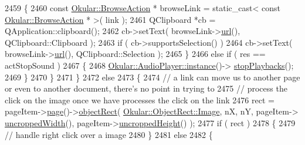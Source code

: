\begin{DoxyCode}
2459                             \{
2460                                 \textcolor{keyword}{const} \hyperlink{classOkular_1_1BrowseAction}{Okular::BrowseAction} * browseLink = \textcolor{keyword}{static\_cast<} \textcolor{keyword}{
      const }\hyperlink{classOkular_1_1BrowseAction}{Okular::BrowseAction} * \textcolor{keyword}{>}( link );
2461                                 QClipboard *cb = QApplication::clipboard();
2462                                 cb->setText( browseLink->\hyperlink{classOkular_1_1BrowseAction_a02dfb682ec078bd783e125696bd00964}{url}(), QClipboard::Clipboard );
2463                                 \textcolor{keywordflow}{if} ( cb->supportsSelection() )
2464                                     cb->setText( browseLink->\hyperlink{classOkular_1_1BrowseAction_a02dfb682ec078bd783e125696bd00964}{url}(), QClipboard::Selection );
2465                             \}
2466                             \textcolor{keywordflow}{else} \textcolor{keywordflow}{if} ( res == actStopSound )
2467                             \{
2468                                 \hyperlink{classOkular_1_1AudioPlayer_a5bbc067e81b46451098a2a0becf23e67}{Okular::AudioPlayer::instance}()->
      \hyperlink{classOkular_1_1AudioPlayer_a48730f5eb7dbc0551679c367e0ba9234}{stopPlaybacks}();
2469                             \}
2470                         \}
2471                     \}
2472                     \textcolor{keywordflow}{else}
2473                     \{
2474                         \textcolor{comment}{// a link can move us to another page or even to another document, there's no point
       in trying to}
2475                         \textcolor{comment}{//  process the click on the image once we have processes the click on the link}
2476                         rect = pageItem->\hyperlink{classPageViewItem_a5c512d95e5563e8d19d1fb3d93dafc31}{page}()->\hyperlink{classOkular_1_1Page_ab6a680a31a5d67861013d706d028dde7}{objectRect}( 
      \hyperlink{classOkular_1_1ObjectRect_a2f77f7653306bae90bfb68277aaafe16a1384fe70201a84f6c3554a7ca6fc84d2}{Okular::ObjectRect::Image}, nX, nY, pageItem->
      \hyperlink{classPageViewItem_a240924407ae22bb0489363a6a2d481b9}{uncroppedWidth}(), pageItem->\hyperlink{classPageViewItem_af1380fce5dc13a72458ef834c720b128}{uncroppedHeight}() );
2477                         \textcolor{keywordflow}{if} ( rect )
2478                         \{
2479                             \textcolor{comment}{// handle right click over a image}
2480                         \}
2481                         \textcolor{keywordflow}{else}
2482                         \{

\end{DoxyCode}
